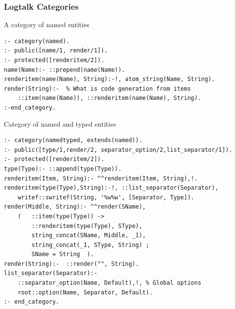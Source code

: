 \documentclass[10pt]{beamer}
\begin{document}
\begin{frame}[fragile]
  \frametitle{Logtalk Categories}
  A category of named entities
\begin{verbatim}
:- category(named).
:- public([name/1, render/1]).
:- protected([renderitem/2]).
name(Name):- ::prepend(name(Name)).
renderitem(name(Name), String):-!, atom_string(Name, String).
render(String):-  % What is code generation from items
    ::item(name(Name)), ::renderitem(name(Name), String).
:-end_category.
\end{verbatim}
Category of named and typed entities
\begin{verbatim}
:- category(namedtyped, extends(named)).
:- public([type/1,render/2, separator_option/2,list_separator/1]).
:- protected([renderitem/2]).
type(Type):- ::append(type(Type)).
renderitem(Item, String):- ^^renderitem(Item, String),!.
renderitem(type(Type),String):-!, ::list_separator(Separator),
    writef::swritef(String, '%w%w', [Separator, Type]).
render(Middle, String):- ^^render(SName),
    (   ::item(type(Type)) ->
        ::renderitem(type(Type), SType),
        string_concat(SName, Middle, _1),
        string_concat(_1, SType, String) ;
        SName = String  ).
render(String):-  ::render("", String).
list_separator(Separator):-
    ::separator_option(Name, Default),!, % Global options
    root::option(Name, Separator, Default).
:- end_category.

\end{verbatim}
\end{frame}
\end{document}
